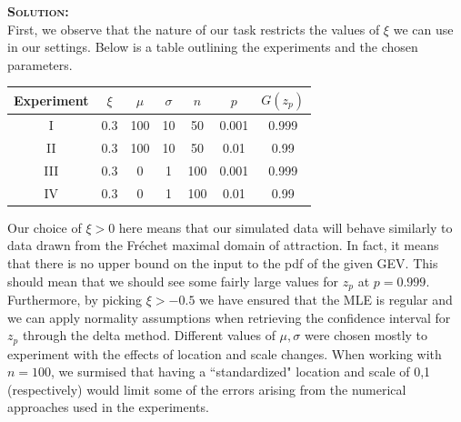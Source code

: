 \documentclass[12pt,oneside]{article}
\newenvironment{solution}
    {\textbf{\textsc{Solution:}}\\}
    {\newpage}
\begin{document}
\begin{solution}
First, we observe that the nature of our task restricts the values of $\xi$ we can use in our settings. Below is a table outlining the experiments and the chosen parameters.
\begin{center}
    \begin{tabular}{||c|c|c|c|c|c|c|}\hline
     Experiment& $\xi$ & $\mu$&$\sigma$ &$n$ &$p$&$G(z_p)$ \\\hline
     I& 0.3 & 100 & 10 & 50 & 0.001&0.999\\\hline
     II&0.3  & 100 & 10 & 50 & 0.01&0.99 \\\hline
     III& 0.3 &0  &1  & 100 & 0.001&0.999\\\hline
     IV& 0.3 &  0&  1& 100 & 0.01&0.99\\\hline
\end{tabular}
\end{center}
Our choice of $\xi>0$ here means that our simulated data will behave similarly to data drawn from the Fréchet maximal domain of attraction. In fact, it means that there is no upper bound on the input to the pdf of the given GEV. This should mean that we should see some fairly large values for $z_p$ at $p=0.999$.  Furthermore, by picking $\xi>-0.5$ we have ensured that the MLE is regular and we can apply normality assumptions when retrieving the confidence interval for $z_p$ through the delta method. Different values of $\mu,\sigma$ were chosen mostly to experiment with the effects of location and scale changes. When working with $n=100$, we surmised that having a ``standardized" location and scale of 0,1 (respectively) would limit some of the errors arising from the numerical approaches used in the experiments.


\end{solution}
\end{document}
